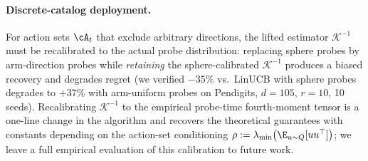 

\paragraph{Discrete-catalog deployment.}
For action sets $\cA_t$ that exclude arbitrary directions, the lifted
estimator $\mathcal K^{-1}$ must be recalibrated to the actual probe
distribution: replacing sphere probes by arm-direction probes while
\emph{retaining} the sphere-calibrated $\mathcal K^{-1}$ produces a
biased recovery and degrades regret (we verified $-35\%$ vs.\ LinUCB
with sphere probes degrades to $+37\%$ with arm-uniform probes on
Pendigits, $d{=}105$, $r{=}10$, 10 seeds).  Recalibrating
$\mathcal K^{-1}$ to the empirical probe-time fourth-moment tensor is
a one-line change in the algorithm and recovers the theoretical
guarantees with constants depending on the action-set conditioning
$\rho := \lambda_{\min}\bigl(\E_{u\sim Q}[uu^\top]\bigr)$; we leave a
full empirical evaluation of this calibration to future work.





